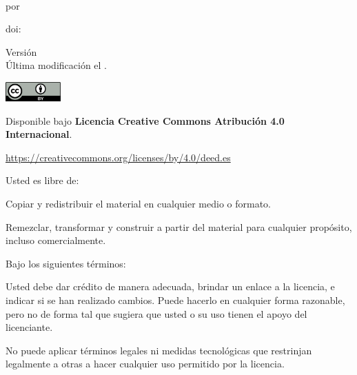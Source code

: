 \vspace*{\fill}

\noindent \textit{\Title{}} \\
por \Soler{}

\noindent doi: \href{https://doi.org/\ThesisDOI}{\ThesisDOI}

\vspace{4em}

\noindent Versión \ThesisVersion{} \\
Última modificación el .

\vspace{5em}

\noindent \includegraphics[height=2em]{figs/logos/cc-by.png}

\noindent Disponible bajo
{\bf Licencia Creative Commons Atribución 4.0 Internacional}.

\noindent
\url{https://creativecommons.org/licenses/by/4.0/deed.es}

\vspace{1em}

\noindent
Usted es libre de:

\begin{description}[labelindent=0.5cm]
    \item[Compartir:]{
        Copiar y redistribuir el material en cualquier medio o formato.
    }
    \item[Adaptar:]{
        Remezclar, transformar y construir a partir del material
        para cualquier propósito, incluso comercialmente.
    }
\end{description}

\noindent Bajo los siguientes términos:

\begin{description}[labelindent=0.5cm]
    \item[Atribución:]{
        Usted debe dar crédito de manera adecuada, brindar un enlace a la
        licencia, e indicar si se han realizado cambios. Puede hacerlo en cualquier
        forma razonable, pero no de forma tal que sugiera que usted o su uso tienen el
        apoyo del licenciante.
    }
    \item[No hay restricciones adicionales:]{
        No puede aplicar términos legales ni medidas tecnológicas que
        restrinjan legalmente a otras a hacer cualquier uso permitido por la
        licencia.
    }
\end{description}

